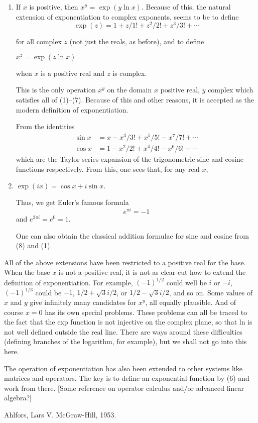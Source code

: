 \begin{enumerate}
  \item If $x$ is positive, then $x^y$ = $\exp(y \ln x)$.  Because of
  this, the natural extension of exponentiation to complex exponents,
  seems to be to define
  \[
  \exp(z) = 1 + z/1! + z^2/2! + z^3/3! + \cdots
  \]

  for all complex $z$ (not just the reals, as before), and to define

  $x^z = \exp(z \ln x)$

  when $x$ is a positive real and $z$ is complex.

  This is the only operation $x^y$ on the domain {$x$ positive real, $y$
    complex} which satisfies all of (1)--(7).  Because of this and other
  reasons, it is accepted as the modern definition of exponentiation.

  From the identities
  \begin{align}
    \sin x &= x - x^3/3! + x^5/5! - x^7/7! + \cdots\\
    \cos x &= 1 - x^2/2! + x^4/4! - x^6/6! + \cdots
  \end{align}
  which are the Taylor series expansion of the trigonometric sine and
  cosine functions respectively.  From this, one sees that, for any real
  $x$,

  \item $\exp(i x) = \cos x + i \sin x.$

  Thus, we get Euler's famous formula
  \[
  e^{\pi i} = -1
  \]
  and
  $e^{2\pi i} = e^0 = 1.$

  One can also obtain the classical addition formulae for sine and
  cosine from (8) and (1).
\end{enumerate}

All of the above extensions have been restricted to a positive real for
the base.  When the base $x$ is not a positive real, it is not as
clear-cut how to extend the definition of exponentiation.  For example,
$(-1)^{1/2}$ could well be $i$ or $-i$, $(-1)^{1/3}$ could be $-1$, $1/2
+ \sqrt 3 i/2$, or $1/2 - \sqrt 3 i/2$, and so on.  Some values of $x$
and $y$ give infinitely many candidates for $x^y$, all equally
plausible.  And of course $x=0$ has its own special problems.  These
problems can all be traced to the fact that the exp function is not
injective on the complex plane, so that ln is not well defined outside
the real line.  There are ways around these difficulties (defining
branches of the logarithm, for example), but we shall not go into this
here.

The operation of exponentiation has also been extended to other systems
like matrices and operators.  The key is to define an exponential
function by (6) and work from there.  [Some reference on operator
calculus and/or advanced linear algebra?]

\Ref

  {Ahlfors, Lars V.}  {McGraw-Hill, 1953.}
